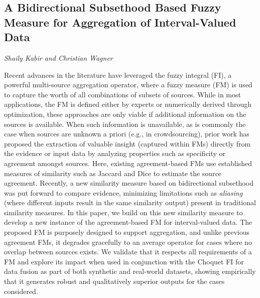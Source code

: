 \documentclass[../booklet.tex]{subfiles}
\begin{document}
\subsection[A Bidirectional Subsethood Based Fuzzy Measure for Aggregation of Interval-Valued Data. {\it Shaily Kabir and Christian Wagner}]{A Bidirectional Subsethood Based Fuzzy Measure for Aggregation of Interval-Valued Data}
 

\begin{center}
  {\it Shaily Kabir and Christian Wagner}
\end{center}



Recent advances in the literature have leveraged the fuzzy integral (FI), a powerful multi-source aggregation operator,  where a fuzzy measure (FM) is used to capture the worth of all combinations of subsets of sources. While in most applications, the FM is defined either by experts or numerically derived through optimization, these approaches are only viable if additional information on the sources is available. When such information is unavailable, as is commonly the case when sources are unknown a priori (e.g., in crowdsourcing), prior work has proposed the extraction of valuable insight (captured within FMs) directly from the evidence or input data by analyzing properties such as specificity or agreement amongst sources. Here, existing agreement-based FMs use established measures of similarity such as Jaccard and Dice to estimate the source agreement. Recently, a new similarity measure based on bidirectional subsethood was put forward to compare evidence, minimizing limitations such as \emph{aliasing} (where different inputs result in the same similarity output) present in traditional similarity measures. In this paper, we build on this new similarity measure to develop a new instance of the agreement-based FM for interval-valued data. The proposed FM is purposely designed to support aggregation, and unlike previous agreement FMs, it degrades gracefully to an average operator for cases where no overlap between sources exists. We validate that it respects all requirements of a FM and explore its impact when used in conjunction with the Choquet FI for data fusion as part of both synthetic and real-world datasets, showing empirically that it generates robust and qualitatively superior outputs for the cases considered.

\end{document}

